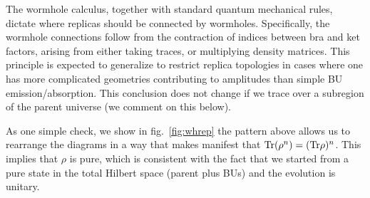 \documentclass[11pt]{article}
\numberwithin{equation}{section}
\begin{document}
The wormhole calculus, together with standard quantum mechanical rules, dictate where replicas should be connected by wormholes.  Specifically, the wormhole connections follow from the contraction of indices between bra and ket factors, arising from either taking traces, or multiplying density matrices.
This principle is  expected to generalize to restrict replica topologies in cases where one has more complicated geometries contributing to amplitudes than simple BU emission/absorption. This conclusion does not change if we trace over a subregion of the parent universe (we comment on this below).

As one simple check, we show in fig.~\ref{fig:whrep} the pattern above allows us to rearrange the diagrams in a way that makes manifest that ${\rm Tr}(\rho^n)=({\rm Tr} \rho)^n$. This implies that $\rho$ is pure, which is consistent with the fact that we started from a pure state in the total Hilbert space (parent plus BUs) and the evolution is unitary. 
\end{document}
